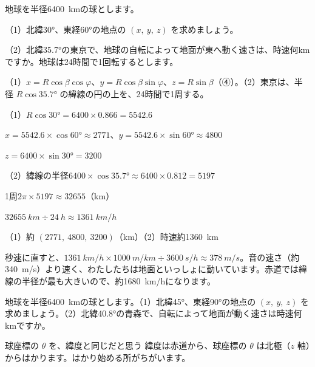 \begin{reidai}[緯度・経度と地球の自転]
地球を半径\qty{6400}{km}の球とします。\par
（1）北緯30°、東経60°の地点の $(x,\ y,\ z)$ を求めましょう。\par
（2）北緯35.7°の東京で、地球の自転によって地面が東へ動く速さは、時速何kmですか。地球は24時間で1回転するとします。\par
\kangaekata（1）$x=R\cos\beta\cos\varphi$、$y=R\cos\beta\sin\varphi$、$z=R\sin\beta$（④）。（2）東京は、半径 $R\cos35.7°$ の緯線の円の上を、24時間で1周する。\par
\shiki（1）$R\cos30°=6400\times0.866=5542.6$\par
\hspace*{4.6\zw}$x=5542.6\times\cos60°\approx2771$、\enspace $y=5542.6\times\sin60°\approx4800$\par
\hspace*{4.6\zw}$z=6400\times\sin30°=3200$\par
\hspace*{2.6\zw}（2）緯線の半径\enspace $6400\times\cos35.7°\approx6400\times0.812=5197$\par
\hspace*{4.6\zw}1周\enspace $2\pi\times5197\approx\num{32655}$（km）\par
\hspace*{4.6\zw}$\qty{32655}{km}\div\qty{24}{h}\approx\qty{1361}{km/h}$\par
\kotae （1）約 $(2771,\ 4800,\ 3200)$（km）\quad（2）時速約\qty{1360}{km}
\end{reidai}
秒速に直すと、$\qty{1361}{km/h}\times\qty{1000}{m/km}\div\qty{3600}{s/h}\approx\qty{378}{m/s}$。音の速さ（約\qty{340}{m/s}）より速く、わたしたちは地面といっしょに動いています。赤道では緯線の半径が最も大きいので、約\qty{1680}{km/h}になります。

\begin{jibun}
地球を半径\qty{6400}{km}の球とします。（1）北緯45°、東経90°の地点の $(x,\ y,\ z)$ を求めましょう。（2）北緯40.8°の青森で、自転によって地面が動く速さは時速何kmですか。
\end{jibun}

\begin{tsumazuki}{球座標の $\theta$ を、緯度と同じだと思う}
緯度は赤道から、球座標の $\theta$ は北極（$z$ 軸）からはかります。はかり始める所がちがいます。
\end{tsumazuki}

